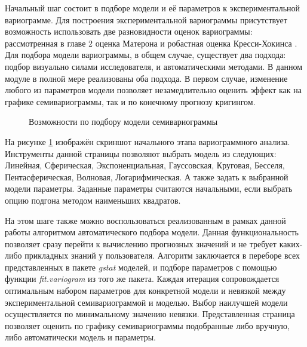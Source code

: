 Начальный шаг состоит в подборе модели и её параметров к экспериментальной вариограмме. Для построения экспериментальной вариограммы присутствует возможность использовать две разновидности оценок вариограммы: рассмотренная в главе 2 оценка Матерона и робастная оценка Кресси-Хокинса \cite{cressie1993statistics}. Для подбора модели вариограммы, в общем случае, существует два подхода: подбор визуально силами исследователя, и автоматическими методами. В данном модуле в полной мере реализованы оба подхода. В первом случае, изменение любого из параметров модели позволяет незамедлительно оценить эффект как на графике семивариограммы, так и по конечному прогнозу кригингом.

\begin{figure}[ht]
\caption{Возможности по подбору модели семивариограммы}
\label{img:mod_variogram}
\end{figure}
На рисунке \ref{img:mod_variogram} изображён скриншот начального этапа вариограммного анализа. Инструменты данной страницы позволяют выбрать модель из следующих: Линейная, Сферическая, Экспоненциальная, Гауссовская, Круговая, Бесселя, Пентасферическая, Волновая, Логарифмическая. А также задать к выбранной модели параметры. Заданные параметры считаются начальными, если выбрать опцию подгона методом наименьших квадратов.

На этом шаге также можно воспользоваться реализованным в рамках данной работы алгоритмом автоматического подбора модели. Данная функциональность позволяет сразу перейти к вычислению прогнозных значений и не требует каких-либо прикладных знаний у пользователя. Алгоритм заключается в переборе всех представленных в пакете \textit{gstat} моделей, и подборе параметров с помощью функции \textit{fit.variogram} из того же пакета. Каждая итерация сопровождается оптимальным набором параметров для конкретной модели и невязкой между экспериментальной семивариограммой и моделью. Выбор наилучшей модели осуществляется по минимальному значению невязки. Представленная страница позволяет оценить по графику семивариограммы подобранные либо вручную, либо автоматически модель и параметры.

